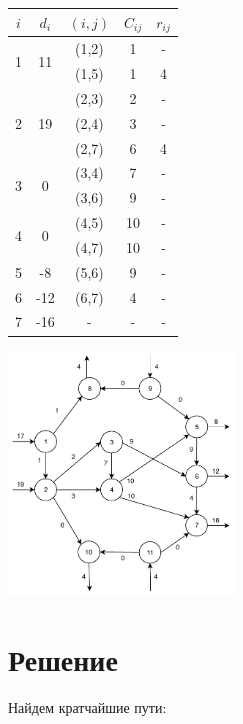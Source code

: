 \documentclass[listings]{labreport}
\begin{document}
\begin{multicols}{2}

\begin{tabular}{|c|c|c|c|c|}
\hline
$i$ & $d_i$ & $(i,j)$ & $C_{ij}$ & $r_{ij}$ \\ \hline
\multirow{2}{*}{1} & \multirow{2}{*}{11} & (1,2) & 1 & - \\
& & (1,5) & 1 & 4 \\ \hline
\multirow{3}{*}{2} & \multirow{3}{*}{19} & (2,3) & 2 & - \\
& & (2,4) & 3 & - \\
& & (2,7) & 6 & 4 \\ \hline
\multirow{2}{*}{3} & \multirow{2}{*}{0} & (3,4) & 7 & - \\
& & (3,6) & 9 & - \\ \hline
\multirow{2}{*}{4} & \multirow{2}{*}{0} & (4,5) & 10 & - \\
& & (4,7) & 10 & - \\ \hline
5 & -8 & (5,6) & 9 & - \\ \hline
6 & -12 & (6,7) & 4 & - \\ \hline
7 & -16 & - & - & - \\ \hline
\end{tabular}

\includegraphics[width=0.45\textwidth]{graph1.pdf}
\end{multicols}

\section*{Решение}

Найдем кратчайшие пути:
\end{document}
